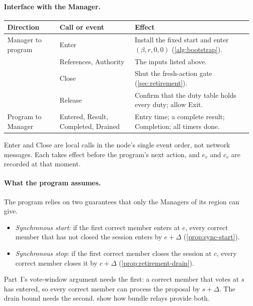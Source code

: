 \documentclass[11pt,a4paper]{article}
\begin{document}
\paragraph{Interface with the Manager.}
\begin{center}\small
\begin{tabularx}{\linewidth}{@{}>{\raggedright\arraybackslash}p{.2\linewidth}>{\raggedright\arraybackslash}p{.27\linewidth}Y@{}}\toprule
Direction & Call or event & Effect\\\midrule
Manager to program & Enter & Install the fixed start and enter
$(\beta,r,0,0)$ (\cref{alg:bootstrap}).\\
& References, Authority & The inputs listed above.\\
& Close & Shut the fresh-action gate (\cref{sec:retirement}).\\
& Release & Confirm that the duty table holds every duty; allow Exit.\\
Program to Manager & Entered, Result, Completed, Drained & Entry time; a
complete result; Completion; all timers done.\\\bottomrule
\end{tabularx}
\end{center}
Enter and Close are local calls in the node's single event order, not
network messages. Each takes effect before the program's next action,
and $e_v$ and $c_v$ are recorded at that moment.

\paragraph{What the program assumes.}
The program relies on two guarantees that only the Managers of its
region can give.
\begin{itemize}
\item \emph{Synchronous start}: if the first correct member enters at
$e$, every correct member that has not closed the session enters by
$e+\Delta$ (\cref{prop:sync-start}).
\item \emph{Synchronous stop}: if the first correct member closes the
session at $c$, every correct member closes it by $c+\Delta$
(\cref{prop:retirement-drain}).
\end{itemize}
Part~I's vote-window argument needs the first: a correct member that
votes at $s$ has entered, so every correct member can process the
proposal by $s+\Delta$. The drain bound needs the second.
 show how bundle relays provide both.
\end{document}
